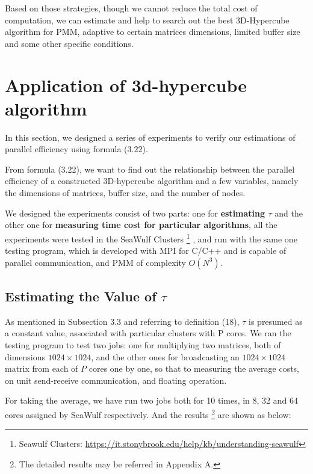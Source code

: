 \documentclass{amsart}
\theoremstyle{definition}
\theoremstyle{remark}
\numberwithin{equation}{section}
\begin{document}
\par
Based on those strategies, though we cannot reduce the total cost of computation, we can estimate and help to search out the best 3D-Hypercube algorithm for PMM, adaptive to certain matrices dimensions, limited buffer size and some other specific conditions.\par


\section{Application of 3d-hypercube algorithm}
	In this section, we designed a series of experiments to verify our estimations of parallel efficiency using formula (3.22).\par
	From formula (3.22), we want to find out the relationship between the parallel efficiency of a constructed 3D-hypercube algorithm and a few variables, namely the dimensions of matrices, buffer size, and the number of nodes.\par
	We designed the experiments consist of two parts: one for \textbf{estimating $\tau$} and the other one for \textbf{measuring time cost for particular algorithms}, all the experiments were tested in the SeaWulf Clusters%
\footnote{Seawulf Clusters: \url{https://it.stonybrook.edu/help/kb/understanding-seawulf}}%
, and run with the same one testing program, which is developed with MPI for C/C++ and is capable of parallel communication, and PMM of complexity $O(N^3)$.\par

\subsection{Estimating the Value of \textbf{$\tau$}}
	As mentioned in Subsection 3.3 and referring to definition (18), $\tau$ is presumed as a constant value, associated with particular clusters with P cores. We ran the testing program to test two jobs: one for multiplying two matrices, both of dimensions $1024\times 1024$, and the other ones for broadcasting an $1024\times 1024$ matrix from each of $P$ cores one by one, so that to measuring the average costs, on unit send-receive communication, and floating operation.\par
	For taking the average, we have run two jobs both for 10 times, in 8, 32 and 64 cores assigned by SeaWulf
respectively. And the results%
\footnote{The detailed results may be referred in Appendix A.}%
 are shown as below:\par
\end{document}
